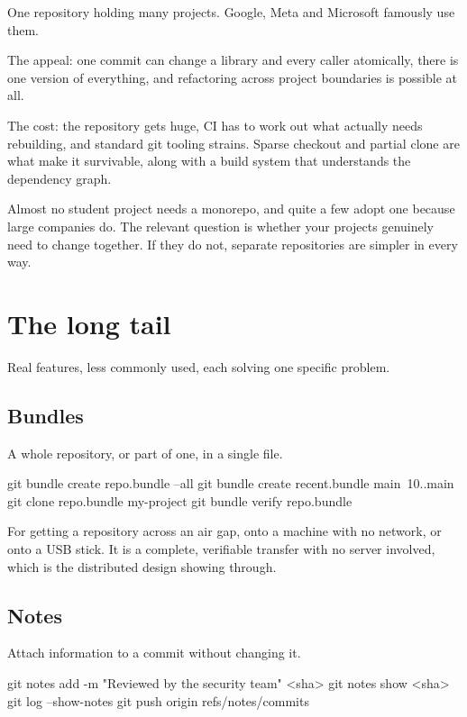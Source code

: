 \documentclass[11pt]{article}
\begin{document}
One repository holding many projects. Google, Meta and Microsoft famously use them.

The appeal: one commit can change a library and every caller atomically, there is one
version of everything, and refactoring across project boundaries is possible at all.

The cost: the repository gets huge, CI has to work out what actually needs rebuilding,
and standard git tooling strains. Sparse checkout and partial clone are what make it
survivable, along with a build system that understands the dependency graph.

\begin{note}
Almost no student project needs a monorepo, and quite a few adopt one because large
companies do. The relevant question is whether your projects genuinely need to change
together. If they do not, separate repositories are simpler in every way.
\end{note}

\section{The long tail}

Real features, less commonly used, each solving one specific problem.

\subsection{Bundles}

A whole repository, or part of one, in a single file.

\begin{shell}
git bundle create repo.bundle --all
git bundle create recent.bundle main~10..main
git clone repo.bundle my-project
git bundle verify repo.bundle
\end{shell}

For getting a repository across an air gap, onto a machine with no network, or onto a
USB stick. It is a complete, verifiable transfer with no server involved, which is
the distributed design showing through.

\subsection{Notes}

Attach information to a commit without changing it.

\begin{shell}
git notes add -m "Reviewed by the security team" <sha>
git notes show <sha>
git log --show-notes
git push origin refs/notes/commits
\end{shell}
\end{document}
